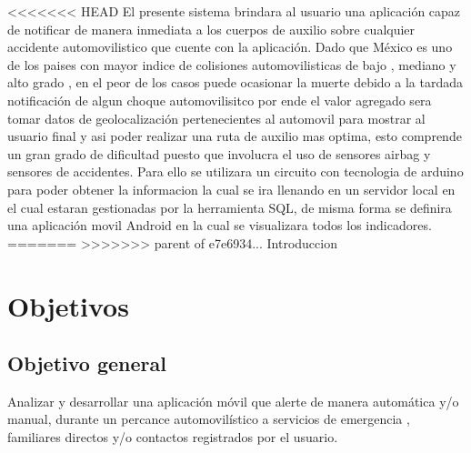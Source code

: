 <<<<<<< HEAD
El presente sistema brindara al usuario una aplicación capaz de notificar de manera inmediata a los cuerpos de auxilio sobre cualquier accidente automovilistico que cuente con la aplicación. Dado que México es uno de los paises con mayor indice de colisiones automovilisticas de bajo , mediano y alto grado , en el peor de los casos puede ocasionar la muerte  debido a la tardada notificación de algun choque automovilisitco por ende el valor agregado sera tomar datos de geolocalización pertenecientes al automovil para mostrar al usuario final  y asi poder realizar una ruta de auxilio mas optima, esto comprende un gran grado de dificultad puesto que involucra el uso de sensores airbag y sensores de accidentes. Para ello se utilizara un circuito con tecnologia de arduino para poder obtener la informacion la cual se ira llenando en un servidor local en el cual estaran gestionadas por la herramienta SQL, de misma forma se definira una aplicación movil Android en la cual se visualizara todos los indicadores.
=======
>>>>>>> parent of e7e6934... Introduccion
 

\section{Objetivos}
\subsection{Objetivo general}
Analizar y desarrollar una aplicación móvil que alerte de manera automática y/o manual, durante un percance automovilístico a servicios de emergencia , familiares directos y/o contactos registrados por el usuario.
